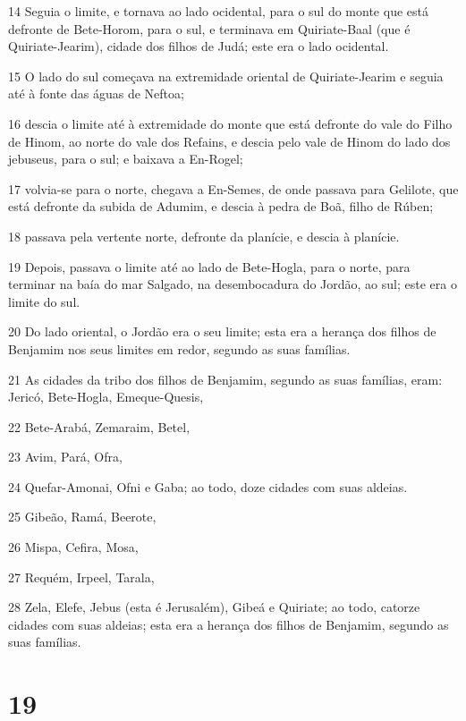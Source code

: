 \par 14 Seguia o limite, e tornava ao lado ocidental, para o sul do monte que está defronte de Bete-Horom, para o sul, e terminava em Quiriate-Baal (que é Quiriate-Jearim), cidade dos filhos de Judá; este era o lado ocidental.
\par 15 O lado do sul começava na extremidade oriental de Quiriate-Jearim e seguia até à fonte das águas de Neftoa;
\par 16 descia o limite até à extremidade do monte que está defronte do vale do Filho de Hinom, ao norte do vale dos Refains, e descia pelo vale de Hinom do lado dos jebuseus, para o sul; e baixava a En-Rogel;
\par 17 volvia-se para o norte, chegava a En-Semes, de onde passava para Gelilote, que está defronte da subida de Adumim, e descia à pedra de Boã, filho de Rúben;
\par 18 passava pela vertente norte, defronte da planície, e descia à planície.
\par 19 Depois, passava o limite até ao lado de Bete-Hogla, para o norte, para terminar na baía do mar Salgado, na desembocadura do Jordão, ao sul; este era o limite do sul.
\par 20 Do lado oriental, o Jordão era o seu limite; esta era a herança dos filhos de Benjamim nos seus limites em redor, segundo as suas famílias.
\par 21 As cidades da tribo dos filhos de Benjamim, segundo as suas famílias, eram: Jericó, Bete-Hogla, Emeque-Quesis,
\par 22 Bete-Arabá, Zemaraim, Betel,
\par 23 Avim, Pará, Ofra,
\par 24 Quefar-Amonai, Ofni e Gaba; ao todo, doze cidades com suas aldeias.
\par 25 Gibeão, Ramá, Beerote,
\par 26 Mispa, Cefira, Mosa,
\par 27 Requém, Irpeel, Tarala,
\par 28 Zela, Elefe, Jebus (esta é Jerusalém), Gibeá e Quiriate; ao todo, catorze cidades com suas aldeias; esta era a herança dos filhos de Benjamim, segundo as suas famílias.

\chapter{19}


